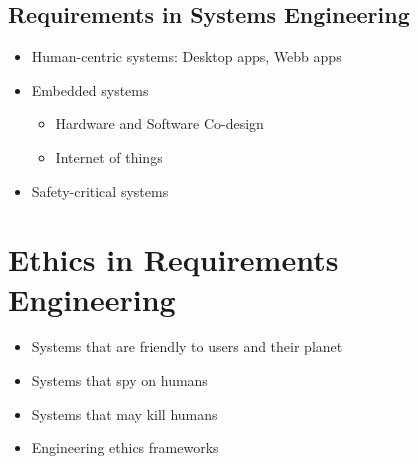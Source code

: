 \subsection{Requirements in Systems Engineering}

\begin{itemize}
  \item Human-centric systems: Desktop apps, Webb apps
  \item Embedded systems
  \begin{itemize}
    \item Hardware and Software Co-design
    \item Internet of things
  \end{itemize}
  \item Safety-critical systems
\end{itemize}

\section{Ethics in Requirements Engineering}

\begin{itemize}
  \item Systems that are friendly to users and their planet
  \item Systems that spy on humans
  \item Systems that may kill humans
  \item Engineering ethics frameworks
\end{itemize}
